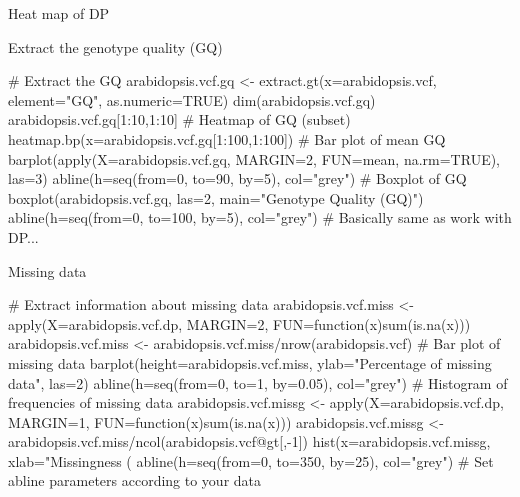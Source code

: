 \documentclass[compress, xelatex, 11pt, xcolor=svgnames, aspectratio=169,
	hyperref={
		bookmarks=true,
		unicode=true,
		colorlinks=true,
		pdftitle={Molecular data in R},
		plainpages=false,
		pdfauthor={Vojtech Zeisek},
		pdfsubject={Course about phylogeny and evolution in R},
		pdfcreator={XeLaTeX},
		pdfkeywords={R, evolution, phylogeny, molecular data},
		linkcolor=Crimson, %
		anchorcolor=Magenta, %
		citecolor=Magenta, %
		filecolor=Magenta, %
		menucolor=Magenta, %
		urlcolor=DodgerBlue, %
		},
	url={hyphens, lowtilde} %
	]{beamer}
\renewcommand{\texttt}[1]{\colorbox{Beige}{{\ttfamily #1}}}
\begin{document}
\begin{frame}{Heat map of DP}
	\begin{center}
		\texttt{[image: vcf\_dp\_heatmap.png]}
	\end{center}
\end{frame}

\begin{frame}[fragile]{Extract the genotype quality (GQ)}
	\begin{spluscode}
    # Extract the GQ
    arabidopsis.vcf.gq <- extract.gt(x=arabidopsis.vcf, element="GQ",
      as.numeric=TRUE)
    dim(arabidopsis.vcf.gq)
    arabidopsis.vcf.gq[1:10,1:10]
    # Heatmap of GQ (subset)
    heatmap.bp(x=arabidopsis.vcf.gq[1:100,1:100])
    # Bar plot of mean GQ
    barplot(apply(X=arabidopsis.vcf.gq, MARGIN=2, FUN=mean, na.rm=TRUE),
      las=3)
    abline(h=seq(from=0, to=90, by=5), col="grey")
    # Boxplot of GQ
    boxplot(arabidopsis.vcf.gq, las=2, main="Genotype Quality (GQ)")
    abline(h=seq(from=0, to=100, by=5), col="grey")
    # Basically same as work with DP...
	\end{spluscode}
\end{frame}

\begin{frame}[fragile]{Missing data}
	\begin{spluscode}
    # Extract information about missing data
    arabidopsis.vcf.miss <- apply(X=arabidopsis.vcf.dp, MARGIN=2,
      FUN=function(x){sum(is.na(x))})
    arabidopsis.vcf.miss <- arabidopsis.vcf.miss/nrow(arabidopsis.vcf)
    # Bar plot of missing data
    barplot(height=arabidopsis.vcf.miss, ylab="Percentage of missing data",
      las=2)
    abline(h=seq(from=0, to=1, by=0.05), col="grey")
    # Histogram of frequencies of missing data
    arabidopsis.vcf.missg <- apply(X=arabidopsis.vcf.dp, MARGIN=1,
      FUN=function(x){sum(is.na(x))})
    arabidopsis.vcf.missg <-
      arabidopsis.vcf.miss/ncol(arabidopsis.vcf@gt[,-1])
    hist(x=arabidopsis.vcf.missg, xlab="Missingness (%
    abline(h=seq(from=0, to=350, by=25), col="grey")
    # Set abline parameters according to your data
	\end{spluscode}
\end{frame}
\end{document}

